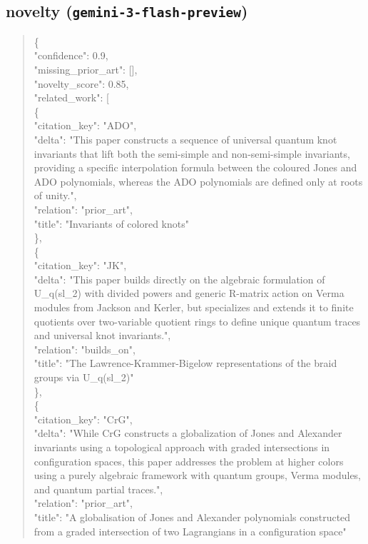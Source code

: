 \documentclass[11pt]{article}
\begin{document}
\subsection*{novelty (\texttt{gemini-3-flash-preview})}
\begin{quote}\small\ttfamily\raggedright
\{\\
  "confidence": 0.9,\\
  "missing\_prior\_art": [],\\
  "novelty\_score": 0.85,\\
  "related\_work": [\\
    \{\\
      "citation\_key": "ADO",\\
      "delta": "This paper constructs a sequence of universal quantum knot invariants that lift both the semi-simple and non-semi-simple invariants, providing a specific interpolation formula between the coloured Jones and ADO polynomials, whereas the ADO polynomials are defined only at roots of unity.",\\
      "relation": "prior\_art",\\
      "title": "Invariants of colored knots"\\
    \},\\
    \{\\
      "citation\_key": "JK",\\
      "delta": "This paper builds directly on the algebraic formulation of U\_q(sl\_2) with divided powers and generic R-matrix action on Verma modules from Jackson and Kerler, but specializes and extends it to finite quotients over two-variable quotient rings to define unique quantum traces and universal knot invariants.",\\
      "relation": "builds\_on",\\
      "title": "The Lawrence-Krammer-Bigelow representations of the braid groups via U\_q(sl\_2)"\\
    \},\\
    \{\\
      "citation\_key": "CrG",\\
      "delta": "While CrG constructs a globalization of Jones and Alexander invariants using a topological approach with graded intersections in configuration spaces, this paper addresses the problem at higher colors using a purely algebraic framework with quantum groups, Verma modules, and quantum partial traces.",\\
      "relation": "prior\_art",\\
      "title": "A globalisation of Jones and Alexander polynomials constructed from a graded intersection of two Lagrangians in a configuration space"\\

\end{quote}
\end{document}
